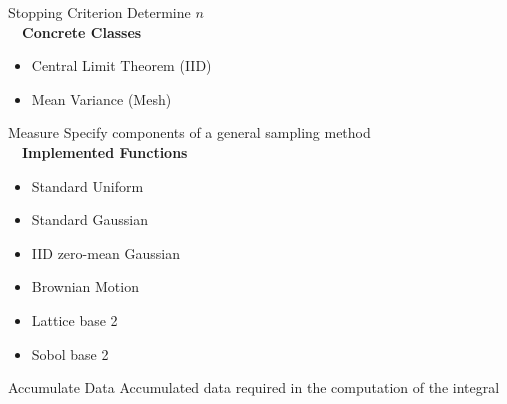 \documentclass[final]{beamer}
\newlength{\onecolwid}
\newlength{\threecolwid}
\begin{document}
\begin{frame}[t]
\begin{columns}[t]
\begin{column}{\threecolwid}
\begin{columns}[t,totalwidth=\threecolwid]
\begin{column}{\onecolwid}%
\begin{alertblock}{Stopping Criterion}
    Determine $n$ \\[1ex]~\
    \textbf{Concrete Classes}
    \begin{itemize}
        \item Central Limit Theorem (IID)
        \item Mean Variance (Mesh)
    \end{itemize}
\end{alertblock}

\begin{alertblock}{Measure}
    Specify components of a general sampling method \\[1ex]~\
    \textbf{Implemented Functions}
    \begin{itemize}
        \item Standard Uniform
        \item Standard Gaussian
        \item IID zero-mean Gaussian
        \item Brownian Motion 
        \item Lattice base 2 \cite{kuo2016application}
        \item Sobol base 2 \cite{kuo2016application}
    \end{itemize}
\end{alertblock}

\begin{alertblock}{Accumulate Data}
    Accumulated data required in the computation of the integral
\end{alertblock}

\end{column}
\end{columns}


\end{column}
\end{columns}
\end{frame}
\end{document}
